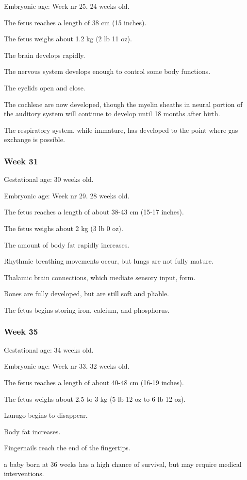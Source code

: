 \documentclass[12pt,a4paper,onecolumn]{article}
\begin{document}
Embryonic age: Week nr 25. 24 weeks old.
\begin{wuxch_item}
    \item The fetus reaches a length of 38 cm (15 inches).
    \item The fetus weighs about 1.2 kg (2 lb 11 oz).
    \item The brain develops rapidly.
    \item The nervous system develops enough to control some body functions.
    \item The eyelids open and close.
    \item The cochleae are now developed, though the myelin sheaths in neural portion of the
      auditory system will continue to develop until 18 months after birth.
    \item The respiratory system, while immature, has developed to the point where gas exchange is possible.
\end{wuxch_item}
\subsubsection{Week 31}

Gestational age: 30 weeks old.

Embryonic age: Week nr 29. 28 weeks old.
\begin{wuxch_item}
    \item The fetus reaches a length of about 38-43 cm (15-17 inches).
    \item The fetus weighs about 2 kg (3 lb 0 oz).
    \item The amount of body fat rapidly increases.
    \item Rhythmic breathing movements occur, but lungs are not fully mature.
    \item Thalamic brain connections, which mediate sensory input, form.
    \item Bones are fully developed, but are still soft and pliable.
    \item The fetus begins storing iron, calcium, and phosphorus.
\end{wuxch_item}
\subsubsection{Week 35}

Gestational age: 34 weeks old.

Embryonic age: Week nr 33. 32 weeks old.
\begin{wuxch_item}
    \item The fetus reaches a length of about 40-48 cm (16-19 inches).
    \item The fetus weighs about 2.5 to 3 kg (5 lb 12 oz to 6 lb 12 oz).
    \item Lanugo begins to disappear.
    \item Body fat increases.
    \item Fingernails reach the end of the fingertips.
    \item a baby born at 36 weeks has a high chance of survival, but may require medical interventions.
\end{wuxch_item}
\end{document}
